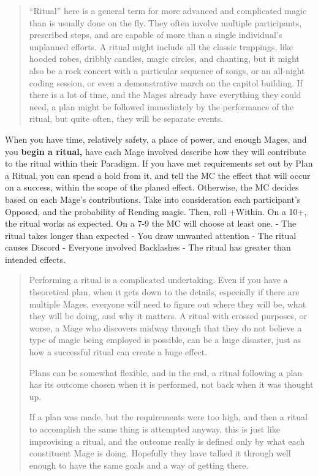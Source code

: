 \documentclass[
  oneside,
  statementpaper,
  9pt]{memoir}
\begin{document}
\begin{quote}
``Ritual'' here is a general term for more advanced and complicated
magic than is usually done on the fly. They often involve multiple
participants, prescribed steps, and are capable of more than a single
individual's unplanned efforts. A ritual might include all the classic
trappings, like hooded robes, dribbly candles, magic circles, and
chanting, but it might also be a rock concert with a particular sequence
of songs, or an all-night coding session, or even a demonstrative march
on the capitol building. If there is a lot of time, and the Mages
already have everything they could need, a plan might be followed
immediately by the performance of the ritual, but quite often, they will
be separate events.
\end{quote}

When you have time, relatively safety, a place of power, and enough
Mages, and you \textbf{begin a ritual,} have each Mage involved describe
how they will contribute to the ritual within their Paradigm. If you
have met requirements set out by Plan a Ritual, you can spend a hold
from it, and tell the MC the effect that will occur on a success, within
the scope of the planed effect. Otherwise, the MC decides based on each
Mage's contributions. Take into consideration each participant's
Opposed, and the probability of Rending magic. Then, roll +Within. On a
10+, the ritual works as expected. On a 7-9 the MC will choose at least
one. - The ritual takes longer than expected - You draw unwanted
attention - The ritual causes Discord - Everyone involved Backlashes -
The ritual has greater than intended effects.

\begin{quote}
Performing a ritual is a complicated undertaking. Even if you have a
theoretical plan, when it gets down to the details, especially if there
are multiple Mages, everyone will need to figure out where they will be,
what they will be doing, and why it matters. A ritual with crossed
purposes, or worse, a Mage who discovers midway through that they do not
believe a type of magic being employed is possible, can be a huge
disaster, just as how a successful ritual can create a huge effect.

Plans can be somewhat flexible, and in the end, a ritual following a
plan has its outcome chosen when it is performed, not back when it was
thought up.

If a plan was made, but the requirements were too high, and then a
ritual to accomplish the same thing is attempted anyway, this is just
like improvising a ritual, and the outcome really is defined only by
what each constituent Mage is doing. Hopefully they have talked it
through well enough to have the same goals and a way of getting there.
\end{quote}
\end{document}
